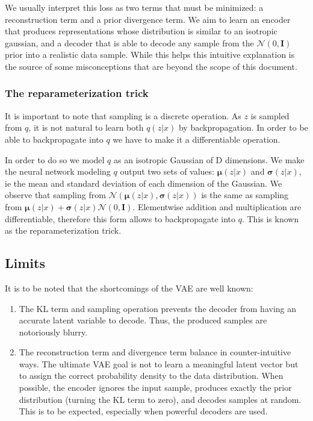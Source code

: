 We usually interpret this loss as two terms that must be minimized: a reconstruction term and a prior divergence term. We aim to learn an encoder that produces representations whose distribution is similar to an isotropic gaussian, and a decoder that is able to decode any sample from the $\mathcal{N}(0, \mathbf{I})$ prior into a realistic data sample.  While this helps this intuitive explanation is the source of some misconceptions that are beyond the scope of this document.

\subsubsection{The reparameterization trick}

It is important to note that sampling is a discrete operation. As $z$ is sampled from $q$, it is not natural to learn both $q(z|x)$ by backpropagation. In order to be able to backpropagate into $q$ we have to make it a differentiable operation.

In order to do so we model $q$ as an isotropic Gaussian of D dimensions. We make the neural network modeling $q$ output two sets of values: $\boldsymbol{\mu}(z|x)$ and $\boldsymbol{\sigma}(z|x)$, ie the mean and standard deviation of each dimension of the Gaussian. We observe that sampling from $\mathcal{N}(\boldsymbol{\mu}(z|x), \boldsymbol{\sigma}(z|x))$ is the same as sampling from $\boldsymbol{\mu}(z|x) + \boldsymbol{\sigma}(z|x)\mathcal{N}(0, \mathbf{I})$. Elementwise addition and multiplication are differentiable, therefore this form allows to backpropagate into $q$. This is known as the reparameterization trick.


\subsection{Limits}

It is to be noted that the shortcomings of the VAE are well known:

\begin{enumerate}
    \item The KL term and sampling operation prevents the decoder from having an accurate latent variable to decode. Thus, the produced samples are notoriously blurry.
    
    \item The reconstruction term and divergence term balance in counter-intuitive ways. The ultimate VAE goal is not to learn a meaningful latent vector but to assign the correct probability density to the data distribution. When possible, the encoder ignores the input sample, produces exactly the prior distribution (turning the KL term to zero), and decodes samples at random. This is to be expected, especially when powerful decoders are used.
\end{enumerate}



